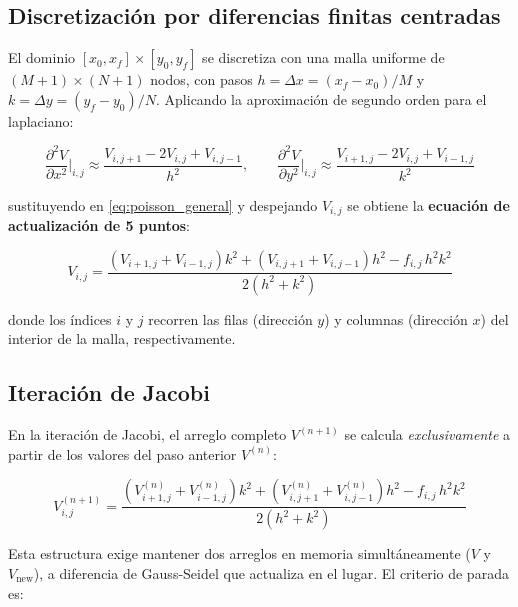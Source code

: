 \documentclass[12pt, a4paper]{article}
\begin{document}
\subsection{Discretización por diferencias finitas centradas}

El dominio $[x_0,x_f]\times[y_0,y_f]$ se discretiza con una malla uniforme de
$(M+1)\times(N+1)$ nodos, con pasos $h=\Delta x=(x_f-x_0)/M$ y
$k=\Delta y=(y_f-y_0)/N$. Aplicando la aproximación de segundo orden para el
laplaciano:

\[
  \frac{\partial^2 V}{\partial x^2}\bigg|_{i,j} \approx
    \frac{V_{i,j+1} - 2V_{i,j} + V_{i,j-1}}{h^2}, \qquad
  \frac{\partial^2 V}{\partial y^2}\bigg|_{i,j} \approx
    \frac{V_{i+1,j} - 2V_{i,j} + V_{i-1,j}}{k^2}
\]

sustituyendo en \eqref{eq:poisson_general} y despejando $V_{i,j}$ se obtiene
la \textbf{ecuación de actualización de 5 puntos}:

\begin{equation}
  \boxed{
  V_{i,j} = \frac{
    \left(V_{i+1,j} + V_{i-1,j}\right)k^2 +
    \left(V_{i,j+1} + V_{i,j-1}\right)h^2 -
    f_{i,j}\,h^2 k^2
  }{2(h^2 + k^2)}
  }
  \label{eq:5puntos}
\end{equation}

donde los índices $i$ y $j$ recorren las filas (dirección $y$) y columnas
(dirección $x$) del interior de la malla, respectivamente.

\subsection{Iteración de Jacobi}

En la iteración de Jacobi, el arreglo completo $V^{(n+1)}$ se calcula
\emph{exclusivamente} a partir de los valores del paso anterior $V^{(n)}$:

\begin{equation}
  V_{i,j}^{(n+1)} = \frac{
    \left(V_{i+1,j}^{(n)} + V_{i-1,j}^{(n)}\right)k^2 +
    \left(V_{i,j+1}^{(n)} + V_{i,j-1}^{(n)}\right)h^2 -
    f_{i,j}\,h^2 k^2
  }{2(h^2 + k^2)}
  \label{eq:jacobi}
\end{equation}

Esta estructura exige mantener dos arreglos en memoria simultáneamente
($V$ y $V_\text{new}$), a diferencia de Gauss-Seidel que actualiza en el lugar.
El criterio de parada es:
\end{document}
